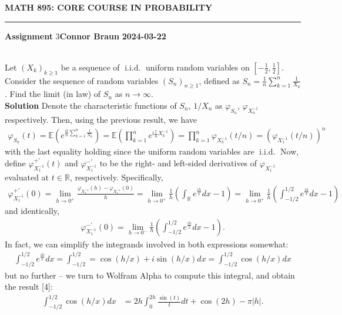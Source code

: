 \documentclass[10pt]{article}
\newcommand{\E}{\mathbb{E}}
\newcommand{\bp}[1]{\left({#1}\right)}
\newcommand{\mbb}[1]{\mathbb{#1}}
\newcommand{\1}[1]{\mathbbm{1}_{#1}}
\DeclareMathOperator{\iid}{i.i.d.}
\begin{document}
    \begin{center}
        {\bf\large{MATH 895: CORE COURSE IN PROBABILITY}}
        \smallskip
        \hrule
        \smallskip
        {\bf Assignment} 3\hfill {\bf Connor Braun} \hfill {\bf 2024-03-22}
    \end{center}
    \\[5pt]
    Let $(X_k)_{k\geq 1}$ be a sequence of $\iid$ uniform random variables on $\left[-\tfrac{1}{2},\tfrac{1}{2}\right]$. Consider the sequence of random variables $(S_n)_{n\geq 1}$, defined as
    $S_n=\tfrac{1}{n}\sum_{k=1}^n\tfrac{1}{X_k}$. Find the limit (in law) of $S_n$ as $n\rightarrow\infty$.\\[5pt]
    {\bf Solution}\hspace{5pt} Denote the characteristic functions of $S_n$, $1/X_n$ as $\varphi_{S_n}$, $\varphi_{X_n^{-1}}$ respectively. Then, using the previous result, we have
    \begin{align*}
        \varphi_{S_n}(t)=\E{\bp{e^{\tfrac{it}{n}\sum_{k=1}^n\tfrac{1}{X_k}}}}=\E{\bp{\prod_{k=1}^ne^{i\tfrac{t}{n}X_k^{-1}}}}=\prod_{k=1}^n\varphi_{X_k^{-1}}(t/n)=(\varphi_{X_1^{-1}}(t/n))^n
    \end{align*}
    with the last equality holding since the uniform random variables are $\iid$ Now, define $\varphi_{X_1^{-1}}^{+\prime}(t)$ and $\varphi_{X_1^{-1}}^{-\prime}$ to be the right- and left-sided derivatives of $\varphi_{X_1^{-1}}$ evaluated at $t\in\mbb{R}$, respectively. Specifically,
    \begin{align*}
        \varphi_{X_1^{-1}}^{+\prime}(0)=\lim_{h\rightarrow 0^+}\frac{\varphi_{X_1^{-1}}(h)-\varphi_{X_1^{-1}}(0)}{h}=\lim_{h\rightarrow 0^+}\frac{1}{h}\bp{\int_\mbb{R}e^{\tfrac{ih}{x}}dx-1}=\lim_{h\rightarrow 0^+}\frac{1}{h}\bp{\int_{-1/2}^{1/2}e^{\tfrac{ih}{x}}dx-1}
    \end{align*}
    and identically,
    \begin{align*}
        \varphi_{X_1^{-1}}^{-\prime}(0)=\lim_{h\rightarrow 0^-}\frac{1}{h}\bp{\int_{-1/2}^{1/2}e^{\tfrac{ih}{x}}dx-1}.
    \end{align*}
    In fact, we can simplify the integrands involved in both expressions somewhat:
    \begin{align*}
        \int_{-1/2}^{1/2}e^{\tfrac{ih}{x}}dx=\int_{-1/2}^{1/2}=\cos(h/x)+i\sin(h/x)dx=\int_{-1/2}^{1/2}\cos(h/x)dx
    \end{align*}
    but no further -- we turn to Wolfram Alpha to compute this integral, and obtain the result [4]:
    \begin{align*}
        \int_{-1/2}^{1/2}\cos(h/x)dx&=2h\int_0^{2h}\frac{\sin(t)}{t}dt+\cos(2h)-\pi|h|.
    \end{align*}
\end{document}
